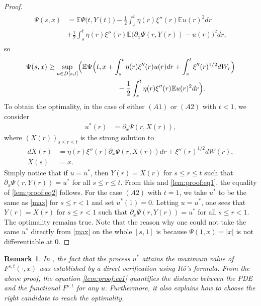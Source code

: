 \documentclass[12pt]{article}
\newcommand{\e}{\mathbb{E}}
\newtheorem{remark}{\bf Remark}
\newenvironment{Proof of lemma}{\noindent{\bf Proof of Lemma}}{\hfill$\Box$\newline}
\newenvironment{Proof of theorem}{\noindent{\bf Proof of Theorem}}{\hfill{\footnotesize${\square}$}\newline}
\newenvironment{Proof of theorems}{\noindent{\bf Proof of Theorems}}{\hfill$\Box$\newline}
\newenvironment{Proof of proposition}{\noindent{\bf Proof of Proposition}}{\hfill$\Box$\newline}
\newenvironment{Proof of propositions}{\noindent{\bf Proof of Propositions}}{\hfill$\Box$\newline}
\newenvironment{Proof of exercise}{\noindent{\it Proof of Exercise:}}{\hfill$\Box$}
\begin{document}
\begin{proof}
\begin{align}
\begin{split}
	\Psi(s,x)&=\e \Psi\big(t,Y(t)\bigr)-\frac{1}{2}\int_s^t\eta(r)\xi''(r)\e u(r)^2dr\\
	&+\frac{1}{2}\int_s^t\eta(r)\xi''(r) \e\bigl(\partial_x\Psi(r,Y(r))-u(r)\bigr)^2dr,
	\end{split}
	\end{align}
	so
	\begin{align}
	\begin{split}\label{lem:proof:eq2}
	\Psi(s,x)&\geq \sup_{u\in D[s,t]}\Bigl(\e \Psi\Big(t,x+\int_s^t\eta(r)\xi''(r)u(r)dr+\int_s^t\xi''(r)^{1/2}dW_r\Bigr)\\
	&\qquad\qquad\qquad\qquad\qquad-\frac{1}{2}\int_s^t\eta(r)\xi''(r)\e u(r)^2dr\Bigr).
	\end{split}
	\end{align}
To obtain the optimality, in the case of either $(A1)$ or $(A2)$ with $t<1$, we consider 
     \begin{align}\label{max}
     u^*(r)&=\partial_x\Psi(r,X(r)),
     \end{align}
     where $(X(r))_{s\leq r\leq t}$ is the strong solution to
     \begin{align*}
     dX(r)&=\eta(r)\xi''(r)\partial_x\Psi(r,X(r))dr+\xi''(r)^{1/2}dW(r),\\
     X(s)&=x.
     \end{align*}
Simply notice that if $u=u^*$, then $Y(r)=X(r)$  for $s\leq r\leq t$ such that $\partial_x\Psi(r,Y(r))=u^*$ for all $s\leq r\leq t$. From this and  \eqref{lem:proof:eq1}, the equality of \eqref{lem:proof:eq2} follows. For the case $(A2)$ with $t=1$, we take $u^*$ to be the same as \eqref{max} for $s\leq r<1$ and set $u^*(1)=0$. Letting $u=u^*$, one sees that $Y(r)=X(r)$ for $s\leq r<1$ such that $\partial_x\Psi(r,Y(r))=u^*$ for all $s\leq r <1$. The optimality remains true. Note that the reason why one could not take the same $u^*$ directly from \eqref{max} on the whole $[s,1]$ is because $\Psi(1,x)=|x|$ is not differentiable at $0$. 
\end{proof}

\begin{remark}
	\rm In \cite{AC14,BK,JT2}, the fact that the process $u^*$ attains the maximum value of $F^{s,t}(\cdot,x)$ was established by a direct verification using It\^{o}'s formula. From the above proof, the equation \eqref{lem:proof:eq1} quantifies the distance between the PDE and the functional $F^{s,t}$ for any $u.$ Furthermore, it also explains how to choose the right candidate to reach the optimality.
\end{remark}
\end{document}
